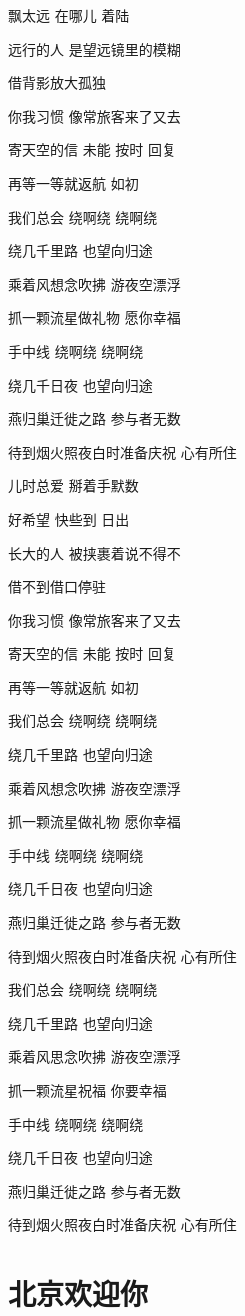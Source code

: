 \documentclass[]{ctexbook}
\begin{document}
飘太远 在哪儿 着陆

远行的人 是望远镜里的模糊

借背影放大孤独

你我习惯 像常旅客来了又去

寄天空的信 未能 按时 回复

再等一等就返航 如初

我们总会 绕啊绕 绕啊绕

绕几千里路 也望向归途

乘着风想念吹拂 游夜空漂浮

抓一颗流星做礼物 愿你幸福

手中线 绕啊绕 绕啊绕

绕几千日夜 也望向归途

燕归巢迁徙之路 参与者无数

待到烟火照夜白时准备庆祝 心有所住

儿时总爱 掰着手默数

好希望 快些到 日出

长大的人 被挟裹着说不得不

借不到借口停驻

你我习惯 像常旅客来了又去

寄天空的信 未能 按时 回复

再等一等就返航 如初

我们总会 绕啊绕 绕啊绕

绕几千里路 也望向归途

乘着风想念吹拂 游夜空漂浮

抓一颗流星做礼物 愿你幸福

手中线 绕啊绕 绕啊绕

绕几千日夜 也望向归途

燕归巢迁徙之路 参与者无数

待到烟火照夜白时准备庆祝 心有所住

我们总会 绕啊绕 绕啊绕

绕几千里路 也望向归途

乘着风思念吹拂 游夜空漂浮

抓一颗流星祝福 你要幸福

手中线 绕啊绕 绕啊绕

绕几千日夜 也望向归途

燕归巢迁徙之路 参与者无数

待到烟火照夜白时准备庆祝 心有所住

\section*{北京欢迎你}\label{welcome-to-beijing}
\end{document}
